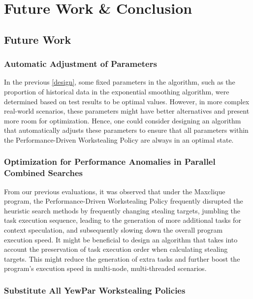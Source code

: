 \documentclass{mproj}
\begin{document}

\chapter{Future Work \& Conclusion}\label{conclusion}

\section{Future Work}

\subsection{Automatic Adjustment of Parameters}

In the previous \cref{design},
some fixed parameters in the algorithm, such as the proportion of historical data in the exponential smoothing algorithm,
were determined based on test results to be optimal values.
However, in more complex real-world scenarios,
these parameters might have better alternatives and present more room for optimization.
Hence, one could consider designing an algorithm that automatically adjusts these parameters
to ensure that all parameters within the Performance-Driven Workstealing Policy are always in an optimal state.

\subsection{Optimization for Performance Anomalies in Parallel Combined Searches}

From our previous evaluations, it was observed that under the Maxclique program,
the Performance-Driven Workstealing Policy frequently disrupted the heuristic search methods by frequently changing stealing targets,
jumbling the task execution sequence,
leading to the generation of more additional tasks for context speculation,
and subsequently slowing down the overall program execution speed.
It might be beneficial to design an algorithm that takes into account the preservation of task execution order when calculating stealing targets.
This might reduce the generation of extra tasks and further boost the program's execution speed in multi-node, multi-threaded scenarios.

\subsection{Substitute All YewPar Workstealing Policies}
\end{document}
